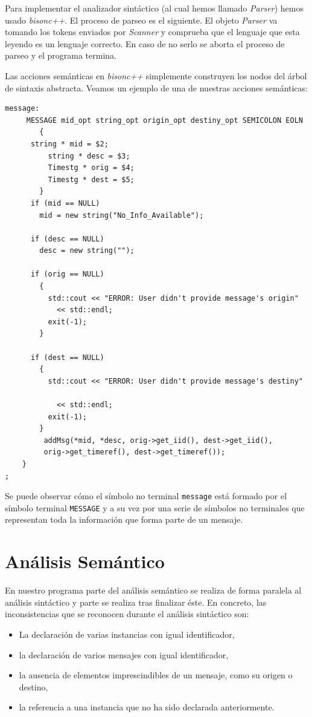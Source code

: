 Para implementar el analizador sintáctico (al cual hemos llamado
\textit{Parser}) hemos usado \textit{bisonc++}. El proceso de parseo
es el siguiente. El objeto \textit{Parser} va tomando los tokens
enviados por \textit{Scanner} y comprueba que el lenguaje que esta
leyendo es un lenguaje correcto. En caso de no serlo se aborta el
proceso de parseo y el programa termina.

Las acciones semánticas en \emph{bisonc++} simplemente construyen los
nodos del árbol de sintaxis abstracta. Veamos un ejemplo de una de
nuestras acciones semánticas: 

\begin{lstlisting}
message:
     MESSAGE mid_opt string_opt origin_opt destiny_opt SEMICOLON EOLN
        { 
	  string * mid = $2;
          string * desc = $3;
          Timestg * orig = $4;
          Timestg * dest = $5;
        }
	  if (mid == NULL)
	    mid = new string("No_Info_Available");

	  if (desc == NULL)
	    desc = new string("");

	  if (orig == NULL)
	    {
	      std::cout << "ERROR: User didn't provide message's origin" 
			<< std::endl;
	      exit(-1);
	    }

	  if (dest == NULL)
	    {
	      std::cout << "ERROR: User didn't provide message's destiny" 

			<< std::endl;
	      exit(-1);
	    }
	     addMsg(*mid, *desc, orig->get_iid(), dest->get_iid(), 
		 orig->get_timeref(), dest->get_timeref());
	}
;
\end{lstlisting}

Se puede observar cómo el símbolo no terminal \lstinline{message} está
formado por el símbolo terminal \lstinline{MESSAGE} y a su vez por una
serie de símbolos no terminales que representan toda la información
que forma parte de un mensaje.

\section{Análisis Semántico}

En nuestro programa parte del análisis semántico se realiza de forma
paralela al análisis sintáctico y parte se realiza tras finalizar
éste. En concreto, las inconsistencias que se reconocen durante el
análisis sintáctico son:
\begin{itemize}
\item La declaración de varias instancias con igual identificador,
\item la declaración de varios mensajes con igual identificador,
\item la ausencia de elementos imprescindibles de un mensaje, como su
  origen o destino,
\item la referencia a una instancia que no ha sido declarada
  anteriormente.
\end{itemize}

